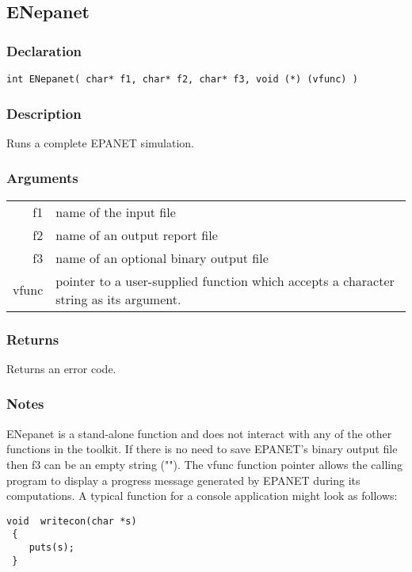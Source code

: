 \subsection{ENepanet}
\subsubsection{Declaration}
\begin{lstlisting}
int ENepanet( char* f1, char* f2, char* f3, void (*) (vfunc) )
\end{lstlisting}

\subsubsection{Description}
Runs a complete EPANET simulation.
\subsubsection{Arguments}
\begin{tabular}{ r p{11cm} }
f1&name of the input file \\[6pt]
f2&name of an output report file \\[6pt]
f3&name of an optional binary output file\\[6pt]
vfunc& pointer to a user-supplied function which accepts a character string as its argument.\\[6pt]
\end{tabular}

 
 
  
\subsubsection{Returns}

 Returns an error code.  
 
  

\subsubsection{Notes}

 ENepanet is a stand-alone function and does not interact with any of the other functions in the toolkit.
 If there is no need to save EPANET's binary output file then f3 can be an empty string ("").
 The vfunc function pointer allows the calling program to display a progress message generated by EPANET 
 during its computations. A typical function for a console application might look as follows:
\begin{lstlisting}
void  writecon(char *s)
 {
    puts(s);
 }
\end{lstlisting}

